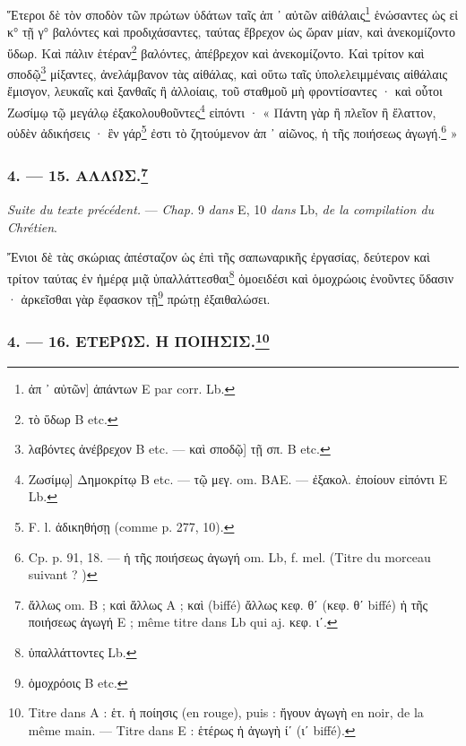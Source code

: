 \documentclass[a4paper, 11pt, oneside, polutonikogreek, french]{article}
\begin{document}
\bigskip

Ἕτεροι δὲ τὸν σποδὸν τῶν πρώτων ὑδάτων ταῖς ἀπ ᾽ αὐτῶν αἰθάλαις\footnote{ἀπ ᾽ αὐτῶν] ἁπάντων E par corr. Lb.} ἑνώσαντες ὡς εἰ κ° τῇ γ° βαλόντες καὶ προδιχάσαντες, ταύτας ἔβρεχον ὡς ὥραν μίαν, καὶ ἀνεκομίζοντο ὕδωρ. Καὶ πάλιν ἑτέραν\footnote{τὸ ὕδωρ B etc.} βαλόντες, ἀπέβρεχον καὶ ἀνεκομίζοντο. Καὶ τρίτον καὶ σποδῷ\footnote{λαβόντες ἀνέβρεχον B etc. --- καὶ σποδῷ] τῇ σπ. B etc.} μίξαντες, ἀνελάμβανον τὰς αἰθάλας, καὶ οὕτω ταῖς ὑπολελειμμέναις αἰθάλαις ἔμισγον, λευκαῖς καὶ ξανθαῖς ἢ ἀλλοίαις, τοῦ σταθμοῦ μὴ φροντίσαντες · καὶ οὗτοι Ζωσίμῳ τῷ μεγάλῳ ἐξακολουθοῦντες\footnote{Ζωσίμῳ] Δημοκρίτῳ B etc. --- τῷ μεγ. om. BAE. --- ἐξακολ. ἐποίουν εἰπόντι E Lb.} εἰπόντι · « Πάντη γὰρ ἢ πλεῖον ἢ ἔλαττον, οὐδὲν ἀδικήσεις · ἓν γάρ\footnote{F. l. ἀδικηθήσῃ (comme p. 277, 10).} ἐστι τὸ ζητούμενον ἀπ ᾽ αἰῶνος, ἡ τῆς ποιήσεως ἀγωγή.\footnote{Cp. p. 91, 18. --- ἡ τῆς ποιήσεως ἀγωγή om. Lb, f. mel. (Titre du morceau suivant ? )} »

\bigskip
\centerline{\EightStarTaper}
\centerline{\EightStarTaper\EightStarTaper}
\bigskip

\subsubsection[4. --- 15. ΑΛΛΩΣ.]{4. --- 15. ΑΛΛΩΣ.\footnote{ἄλλως om. B ; καὶ ἄλλως A ; καὶ (biffé) ἄλλως κεφ. θʹ (κεφ. θʹ biffé) ἡ τῆς ποιήσεως ἀγωγή E ; même titre dans Lb qui aj. κεφ. ιʹ.}}

\emph{Suite du texte précédent.} --- \emph{Chap.} 9 \emph{dans} E, 10 \emph{dans} Lb, \emph{de la compilation du Chrétien}.

\bigskip

Ἔνιοι δὲ τὰς σκώριας ἀπέσταζον ὡς ἐπὶ τῆς σαπωναρικῆς ἐργασίας, δεύτερον καὶ τρίτον ταύτας ἐν ἡμέρᾳ μιᾷ ὑπαλλάττεσθαι\footnote{ὑπαλλάττοντες Lb.} ὁμοειδέσι καὶ ὁμοχρώοις ἑνοῦντες ὕδασιν · ἀρκεῖσθαι γὰρ ἔφασκον τῇ\footnote{ὁμοχρόοις B etc.} πρώτῃ ἐξαιθαλώσει.

\bigskip
\centerline{\EightStarTaper}
\centerline{\EightStarTaper\EightStarTaper}
\bigskip

\subsubsection[4. --- 16. ΕΤΕΡΩΣ. Η ΠΟΙΗΣΙΣ.]{4. --- 16. ΕΤΕΡΩΣ. Η ΠΟΙΗΣΙΣ.\footnote{Titre dans A : ἑτ. ἡ ποίησις (en rouge), puis : ἤγουν ἀγωγὴ en noir, de la même main. --- Titre dans E : ἑτέρως ἡ ἀγωγὴ ίʹ (ιʹ biffé).}}
\end{document}
